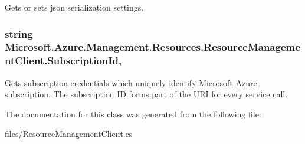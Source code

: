 Gets or sets json serialization settings. 

\subsubsection[{\texorpdfstring{Subscription\+Id}{SubscriptionId}}]{\setlength{\rightskip}{0pt plus 5cm}string Microsoft.\+Azure.\+Management.\+Resources.\+Resource\+Management\+Client.\+Subscription\+Id\hspace{0.3cm}{\ttfamily [get]}, {\ttfamily [set]}}\hypertarget{class_microsoft_1_1_azure_1_1_management_1_1_resources_1_1_resource_management_client_a802627c8b37d0a015887bb3d6e1beb32}{}\label{class_microsoft_1_1_azure_1_1_management_1_1_resources_1_1_resource_management_client_a802627c8b37d0a015887bb3d6e1beb32}


Gets subscription credentials which uniquely identify \hyperlink{namespace_microsoft}{Microsoft} \hyperlink{namespace_microsoft_1_1_azure}{Azure} subscription. The subscription ID forms part of the U\+RI for every service call. 



The documentation for this class was generated from the following file\+:\begin{DoxyCompactItemize}
\item 
files/Resource\+Management\+Client.\+cs\end{DoxyCompactItemize}
